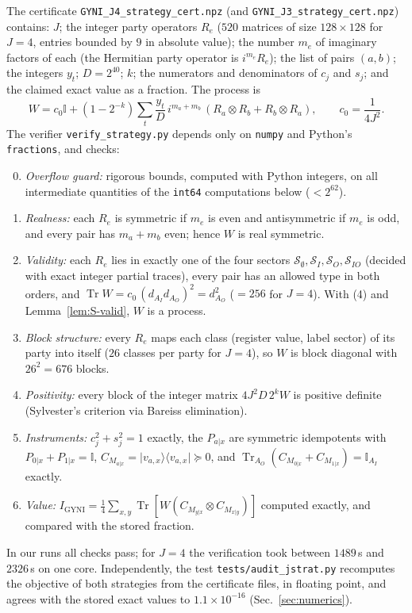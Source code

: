 \documentclass[aps,pra,onecolumn,notitlepage,superscriptaddress,longbibliography,nofootinbib,11pt]{revtex4-2}
\theoremstyle{remark}
\newcommand{\Tr}{\operatorname{Tr}}
\newcommand{\ket}[1]{\lvert #1\rangle}
\newcommand{\bra}[1]{\langle #1\rvert}
\newcommand{\one}{\mathbb{I}}
\newcommand{\Igy}{I_{\mathrm{GYNI}}}
\newcommand{\file}[1]{\texttt{#1}}
\begin{document}
The certificate \file{GYNI\_J4\_strategy\_cert.npz} (and \file{GYNI\_J3\_strategy\_cert.npz}) contains: $J$; the integer party operators $R_e$ ($520$ matrices of size $128\times128$ for $J=4$, entries bounded by $9$ in absolute value); the number $m_e$ of imaginary factors of each (the Hermitian party operator is $i^{m_e}R_e$); the list of pairs $(a,b)$; the integers $y_t$; $D=2^{40}$; $k$; the numerators and denominators of $c_j$ and $s_j$; and the claimed exact value as a fraction. The process is
\begin{equation}
W=c_0\one+(1-2^{-k})\sum_t\frac{y_t}{D}\,i^{m_a+m_b}\,(R_a\otimes R_b+R_b\otimes R_a),\qquad c_0=\frac{1}{4J^2}.
\end{equation}
The verifier \file{verify\_strategy.py} depends only on \file{numpy} and Python's \file{fractions}, and checks:
\begin{enumerate}
\setcounter{enumi}{-1}
\item \emph{Overflow guard:} rigorous bounds, computed with Python integers, on all intermediate quantities of the \file{int64} computations below ($<2^{62}$).
\item \emph{Realness:} each $R_e$ is symmetric if $m_e$ is even and antisymmetric if $m_e$ is odd, and every pair has $m_a+m_b$ even; hence $W$ is real symmetric.
\item \emph{Validity:} each $R_e$ lies in exactly one of the four sectors $\mathcal S_\emptyset,\mathcal S_I,\mathcal S_O,\mathcal S_{IO}$ (decided with exact integer partial traces), every pair has an allowed type in both orders, and $\Tr W=c_0\,(d_{A_I}d_{A_O})^2=d_{A_O}^2$ ($=256$ for $J=4$). With (4) and Lemma~\ref{lem:S-valid}, $W$ is a process.
\item \emph{Block structure:} every $R_e$ maps each class (register value, label sector) of its party into itself ($26$ classes per party for $J=4$), so $W$ is block diagonal with $26^2=676$ blocks.
\item \emph{Positivity:} every block of the integer matrix $4J^2D\,2^kW$ is positive definite (Sylvester's criterion via Bareiss elimination).
\item \emph{Instruments:} $c_j^2+s_j^2=1$ exactly, the $P_{a|x}$ are symmetric idempotents with $P_{0|x}+P_{1|x}=\one$, $C_{M_{a|x}}=\ket{v_{a,x}}\bra{v_{a,x}}\succeq0$, and $\Tr_{A_O}(C_{M_{0|x}}+C_{M_{1|x}})=\one_{A_I}$ exactly.
\item \emph{Value:} $\Igy=\frac14\sum_{x,y}\Tr[W(C_{M_{y|x}}\otimes C_{M_{x|y}})]$ computed exactly, and compared with the stored fraction.
\end{enumerate}
In our runs all checks pass; for $J=4$ the verification took between $1489$\,s and $2326$\,s on one core. Independently, the test \file{tests/audit\_jstrat.py} recomputes the objective of both strategies from the certificate files, in floating point, and agrees with the stored exact values to $1.1\times10^{-16}$ (Sec.~\ref{sec:numerics}).
\end{document}
